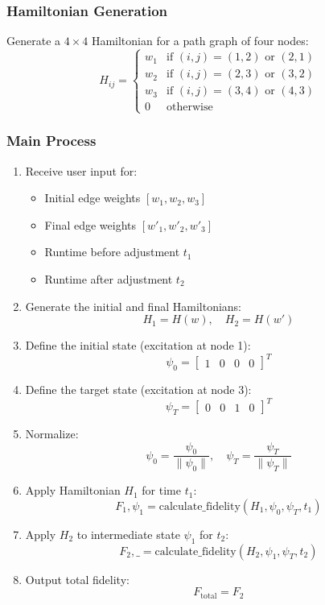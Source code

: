 \documentclass[aps]{revtex4-2}
\begin{document}
\subsubsection{Hamiltonian Generation}
\noindent Generate a $4 \times 4$ Hamiltonian for a path graph of four nodes:
\[
H_{ij} = \begin{cases}
w_1 & \text{if } (i, j) = (1, 2) \text{ or } (2, 1) \\
w_2 & \text{if } (i, j) = (2, 3) \text{ or } (3, 2) \\
w_3 & \text{if } (i, j) = (3, 4) \text{ or } (4, 3) \\
0 & \text{otherwise}
\end{cases}
\]

\subsubsection{Main Process}
\begin{enumerate}
    \item Receive user input for:
    \begin{itemize}
        \item Initial edge weights $[w_1, w_2, w_3]$
        \item Final edge weights $[w'_1, w'_2, w'_3]$
        \item Runtime before adjustment $t_1$
        \item Runtime after adjustment $t_2$
    \end{itemize}
    \item Generate the initial and final Hamiltonians:
    \[
    H_1 = H(w), \quad H_2 = H(w')
    \]
    \item Define the initial state (excitation at node 1):
    \[
    \psi_0 = \begin{bmatrix} 1 & 0 & 0 & 0 \end{bmatrix}^T
    \]
    \item Define the target state (excitation at node 3):
    \[
    \psi_T = \begin{bmatrix} 0 & 0 & 1 & 0 \end{bmatrix}^T
    \]
    \item Normalize:
    \[
    \psi_0 = \frac{\psi_0}{\| \psi_0 \|}, \quad \psi_T = \frac{\psi_T}{\| \psi_T \|}
    \]
    \item Apply Hamiltonian $H_1$ for time $t_1$:
    \[
    F_1, \psi_1 = \text{calculate\_fidelity}(H_1, \psi_0, \psi_T, t_1)
    \]
    \item Apply $H_2$ to intermediate state $\psi_1$ for $t_2$:
    \[
    F_2, \_ = \text{calculate\_fidelity}(H_2, \psi_1, \psi_T, t_2)
    \]
    \item Output total fidelity:
    \[
    F_{\text{total}} = F_2
    \]
\end{enumerate}
\end{document}
